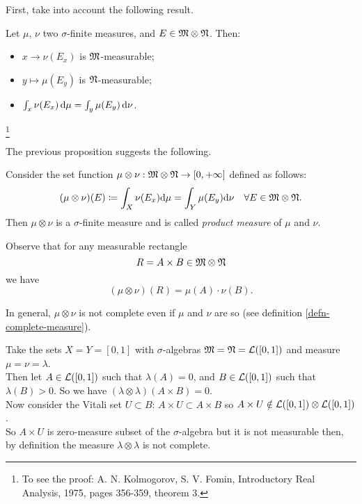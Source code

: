 First, take into account the following result.
\begin{prop} \label{fin-meas-cart-integrable}%
	Let $\mu$, $\nu$ two $\sigma$-finite measures, and $E\in \mathfrak M \otimes \mathfrak N$. Then:
	\begin{itemize}
		\item $ x \to \nu(E_x)$ is $\mathfrak M$-measurable;
		\item $y \mapsto \mu(E_y)$ is $\mathfrak N$-measurable;
		\item $\int_x \nu(E_x) \,\mathrm d \mu = \int_y \mu (E_y) \,\mathrm d \nu$.
	\end{itemize}
\end{prop}\footnote{To see the proof: A. N. Kolmogorov, S. V. Fomin, Introductory Real Analysis, 1975, pages 356-359, theorem 3.}

The previous proposition suggests the following.
\begin{defn}
	Consider the set function $\mu \otimes \nu : \mathfrak M \otimes \mathfrak N \to [0,+\infty]$ defined as follows:
	$$
	(\mu \otimes \nu)(E) 
	\coloneqq  \int_X\nu(E_x) \mathrm d \mu 
	= \int_Y \mu (E_y) \mathrm d \nu 
	\quad \forall E \in \mathfrak M \otimes \mathfrak N
	.
	$$
	Then $\mu \otimes \nu$ is a $\sigma$-finite measure and is called \emph{product measure} of $\mu$ and $\nu$.
\end{defn}

Observe that for any measurable rectangle 
$$
R
=A\times B 
\in \mathfrak M \otimes \mathfrak N
$$
we have
$$
(\mu \otimes \nu)(R)
=\mu(A) \cdot \nu(B)
.
$$

In general, $\mu \otimes \nu$ is not complete even if $\mu$ and $\nu$ are so (see definition \vref{defn-complete-measure}).
\begin{exam}
	Take the sets $X=Y=[0,1]$ with $\sigma$-algebras $\mathfrak M=\mathfrak N=\mathcal L([0,1])$ and measure $\mu = \nu = \lambda$. \\
	Then let $A\in \mathcal L ([0,1])$ such that $\lambda(A)=0$, and $B \in \mathcal L ([0,1])$ such that $\lambda(B)>0$.
	So we have $(\lambda \otimes \lambda)(A \times B)=0$. \\
	Now consider the Vitali set $U \subset B$:  $A \times U \subset A \times B$ so $A \times U \notin \mathcal L([0,1]) \otimes \mathcal L([0,1])$.\\
	So $A\times U$ is zero-measure subset of the $\sigma$-algebra but it is not measurable then, by definition the measure $\lambda \otimes \lambda$ is not complete.
\end{exam}

